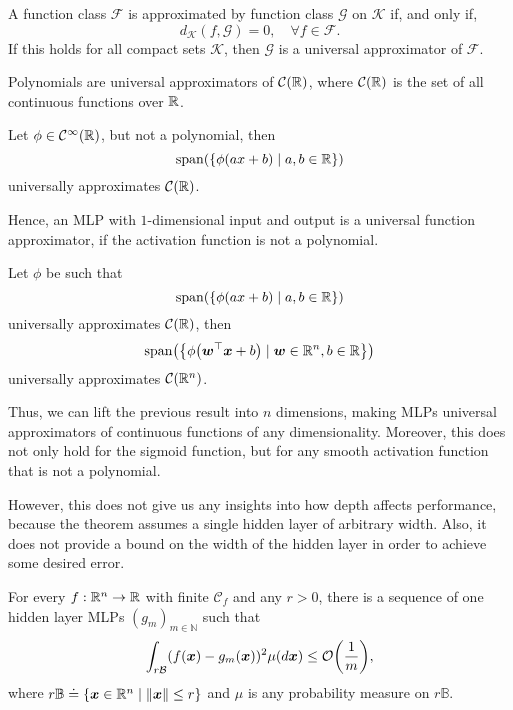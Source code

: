 \begin{definition}
    A function class $\mathcal{F}$ is approximated by function class $\mathcal{G}$ on $\mathcal{K}$ if, and only if, \[
        d_{\mathcal{K}}(f, \mathcal{G}) = 0, \quad \forall f \in \mathcal{F}.
    \]
    If this holds for all compact sets $\mathcal{K}$, then $\mathcal{G}$ is a universal approximator of
    $\mathcal{F}$.
\end{definition}

\begin{theorem}
    Polynomials are universal approximators of $\mathcal{C}(\mathbb{R})$, where $\mathcal{C}(\mathbb{R})$ is the set
    of all continuous functions over $\mathbb{R}$.
\end{theorem}

\begin{theorem}
    Let $\phi \in \mathcal{C}^{\infty}(\mathbb{R})$, but not a polynomial, then \[
        \mathrm{span}(\{ \phi(ax + b) \mid a,b \in \mathbb{R} \})
    \]
    universally approximates $\mathcal{C}(\mathbb{R})$.
\end{theorem}

Hence, an MLP with $1$-dimensional input and output is a universal function approximator, if the
activation function is not a polynomial.

\begin{lemma}
    Let $\phi$ be such that \[
        \mathrm{span}(\{ \phi(ax + b) \mid a,b \in \mathbb{R} \})
    \]
    universally approximates $\mathcal{C}(\mathbb{R})$, then \[
        \mathrm{span}\lft( \lft\{ \phi \lft( \transpose{\vec{w}}\vec{x} + b \rgt) \mid \vec{w} \in \R^n, b \in \R \rgt\} \rgt)
    \]
    universally approximates $\mathcal{C}(\mathbb{R}^n)$.
\end{lemma}

Thus, we can lift the previous result into $n$ dimensions, making MLPs universal approximators of
continuous functions of any dimensionality. Moreover, this does not only hold for the sigmoid
function, but for any smooth activation function that is not a polynomial.

However, this does not give us any insights into how depth affects performance, because the theorem
assumes a single hidden layer of arbitrary width. Also, it does not provide a bound on the width of
the hidden layer in order to achieve some desired error.

\begin{theorem}
    For every $f: \mathbb{R}^n \to \mathbb{R}$ with finite $\mathcal{C}_f$ and any $r > 0$, there is a sequence of one hidden layer MLPs $(g_m)_{m \in \mathbb{N}}$ such that \[
        \int_{r \mathcal{B}} (f(\vec{x}) - g_m(\vec{x}))^2 \mu(d \vec{x}) \leq \bigo{\frac{1}{m}},
    \]
    where $r \mathbb{B} \doteq \{ \bm{x} \in \mathbb{R}^n \mid \| \bm{x} \| \leq r \}$ and $\mu$ is any
    probability measure on $r \mathbb{B}$.
\end{theorem}


